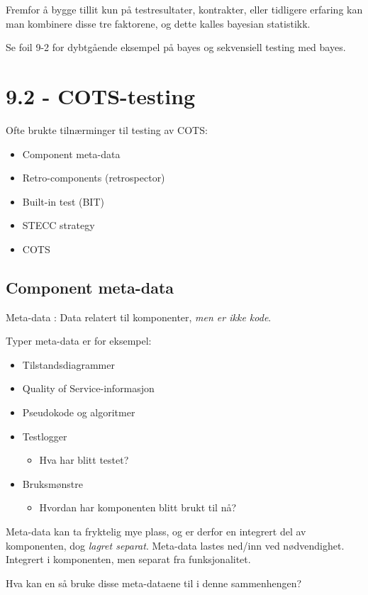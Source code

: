 Fremfor å bygge tillit kun på testresultater, kontrakter, eller
tidligere erfaring kan man kombinere disse tre faktorene, og dette
kalles bayesian statistikk.

Se foil 9-2 for dybtgående eksempel på bayes og sekvensiell testing med
bayes.

\section{9.2 - COTS-testing}

Ofte brukte tilnærminger til testing av COTS:

\begin{itemize}
\item
  Component meta-data
\item
  Retro-components (retrospector)
\item
  Built-in test (BIT)
\item
  STECC strategy
\item
  COTS
\end{itemize}
\subsection{Component meta-data}

Meta-data : Data relatert til komponenter, \emph{men er ikke kode}.

Typer meta-data er for eksempel:

\begin{itemize}
\item
  Tilstandsdiagrammer
\item
  Quality of Service-informasjon
\item
  Pseudokode og algoritmer
\item
  Testlogger
  \begin{itemize}
  \item
    Hva har blitt testet?
  \end{itemize}
\item
  Bruksmønstre
  \begin{itemize}
  \item
    Hvordan har komponenten blitt brukt til nå?
  \end{itemize}
\end{itemize}
Meta-data kan ta fryktelig mye plass, og er derfor en integrert del av
komponenten, dog \emph{lagret separat}. Meta-data lastes ned/inn ved
nødvendighet. Integrert i komponenten, men separat fra funksjonalitet.

Hva kan en så bruke disse meta-dataene til i denne sammenhengen?


